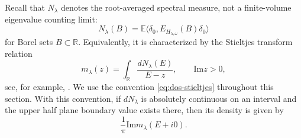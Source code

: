 \documentclass[a4paper,11pt]{article}
\newcommand{\E}{\mathbb{E}}
\newcommand{\Impart}{\mathrm{Im}}
\begin{document}
Recall that $N_\lambda$ denotes the root-averaged spectral measure, not a 
finite-volume eigenvalue counting limit:
$$
N_\lambda(B)
=
\E\langle \delta_0,E_{H_{\lambda,\omega}}(B)\delta_0\rangle
$$
for Borel sets $B\subset\mathbb R$. 
Equivalently, it is characterized by the Stieltjes transform relation
\begin{equation}
\label{eq:dos-stieltjes}
m_\lambda(z)=\int_{\mathbb R}\frac{dN_\lambda(E)}{E-z},
\qquad\Impart z>0,
\end{equation}
see, for example, \cite{KirschMetzger2007}. 
We use the convention \eqref{eq:dos-stieltjes} throughout this section.
With this convention,
if $dN_\lambda$ is absolutely continuous on an interval and the upper
half plane boundary value exists there, then its density is given by
$$
\frac{1}{\pi}\Impart m_\lambda(E+i0).
$$
\end{document}

